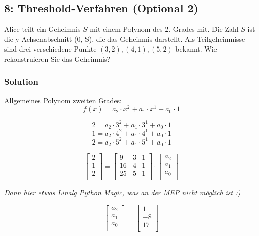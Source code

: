 \documentclass[11pt]{article}
\begin{document}
    \hypertarget{aufgabe-8-threshold-verfahren-optional-2}{%
\subsection{8: Threshold-Verfahren (Optional
2)}\label{aufgabe-8-threshold-verfahren-optional-2}}

Alice teilt ein Geheimnis \(S\) mit einem Polynom des 2. Grades mit. Die
Zahl \(S\) ist die y-Achsenabschnitt (0, S), die das Geheimnis
darstellt. Als Teilgeheimnisse sind drei verschiedene Punkte
\((3, 2), (4, 1), (5, 2)\) bekannt. Wie rekonstruieren Sie das
Geheimnis?

\hypertarget{solution}{%
\subsubsection{Solution}\label{solution}}

Allgemeines Polynom zweiten Grades:
\[f(x) = a_2\cdot x^2 + a_1\cdot x^1 + a_0\cdot 1\]

\[ 2 = a_2\cdot 3^2 + a_1\cdot 3^1 + a_0\cdot 1\]
\[ 1 = a_2\cdot 4^2 + a_1\cdot 4^1 + a_0\cdot 1\]
\[ 2 = a_2\cdot 5^2 + a_1\cdot 5^1 + a_0\cdot 1\]

\[
\begin{bmatrix}
2\\
1\\
2\\
\end{bmatrix}
=
\begin{bmatrix}
9 & 3 & 1\\
16 & 4 & 1\\
25 & 5 & 1\\
\end{bmatrix}
\cdot
\begin{bmatrix}
a_2\\
a_1\\
a_0\\
\end{bmatrix}
\]

\emph{Dann hier etwas Linalg Python Magic, was an der MEP nicht möglich
ist :)}

\[
\begin{bmatrix}
a_2\\
a_1\\
a_0\\
\end{bmatrix}
=
\begin{bmatrix}
1\\
-8\\
17\\
\end{bmatrix}
\]
\end{document}
